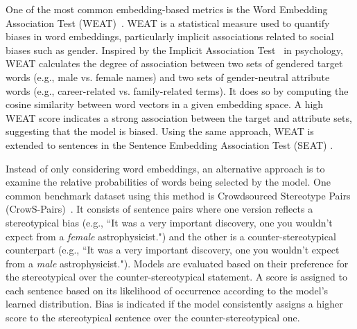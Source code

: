\documentclass{DESSThesis}
\begin{document}

One of the most common embedding-based metrics is the Word Embedding Association Test (WEAT)~\cite{caliskan_semantics_2017}. WEAT is a statistical measure used to quantify biases in word embeddings, particularly implicit associations related to social biases such as gender. Inspired by the Implicit Association Test~\cite{greenwald_measuring_1998} in psychology, WEAT calculates the degree of association between two sets of gendered target words (e.g., male vs. female names) and two sets of gender-neutral attribute words (e.g., career-related vs. family-related terms). It does so by computing the cosine similarity between word vectors in a given embedding space. A high WEAT score indicates a strong association between the target and attribute sets, suggesting that the model is biased. Using the same approach, WEAT is extended to sentences in the Sentence Embedding Association Test (SEAT) \cite{may_measuring_2019}.

Instead of only considering word embeddings, an alternative approach is to examine the relative probabilities of words being selected by the model. One common benchmark dataset using this method is Crowdsourced Stereotype Pairs (CrowS-Pairs)~\cite{nangia_crows-pairs_2020}. It consists of sentence pairs where one version reflects a stereotypical bias (e.g., ``It was a very important discovery, one you wouldn’t expect from a \textit{female} astrophysicist.") and the other is a counter-stereotypical counterpart (e.g., ``It was a very important discovery, one you wouldn’t expect from a \textit{male} astrophysicist."). Models are evaluated based on their preference for the stereotypical over the counter-stereotypical statement. A score is assigned to each sentence based on its likelihood of occurrence according to the model's learned distribution. Bias is indicated if the model consistently assigns a higher score to the stereotypical sentence over the counter-stereotypical one.
\end{document}
